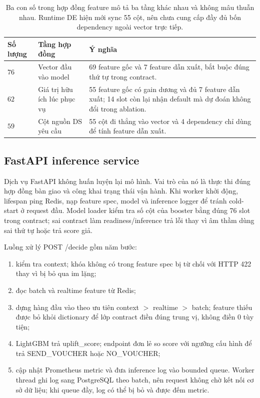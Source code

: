 \documentclass[11pt,a4paper]{article}
\DeclareRobustCommand{\code}[1]{{\small\texttt{#1}}}
\def\code#1{#1}%
\begin{document}
\begin{table}[H]
\centering
\small
\begin{tabularx}{\textwidth}{>{\centering\arraybackslash}p{1.8cm}
    >{\raggedright\arraybackslash}p{4.0cm}X}
\toprule
\textbf{Số lượng} & \textbf{Tầng hợp đồng} & \textbf{Ý nghĩa} \\
\midrule
$76$ & Vector đầu vào model & 69 feature gốc và 7 feature dẫn xuất, bắt buộc đúng thứ tự trong contract. \\
$62$ & Giá trị hữu ích lúc phục vụ & 55 feature gốc có gain dương và đủ 7 feature dẫn xuất; 14 slot còn lại nhận default mà dự đoán không đổi trong ablation. \\
$59$ & Cột nguồn DS yêu cầu & 55 cột đi thẳng vào vector và 4 dependency chỉ dùng để tính feature dẫn xuất. \\
\bottomrule
\end{tabularx}
\caption{Ba con số trong hợp đồng feature mô tả ba tầng khác nhau và không
mâu thuẫn nhau. Runtime DE hiện mới sync 55 cột, nên chưa cung cấp đầy đủ bốn
dependency ngoài vector trực tiếp.}
\label{tab:feature-contract-layers}
\end{table}

\subsection{FastAPI inference service}

Dịch vụ FastAPI không huấn luyện lại mô hình. Vai trò của nó là thực thi
đúng hợp đồng bàn giao và công khai trạng thái vận hành. Khi worker khởi động,
\code{lifespan} ping Redis, nạp feature spec, model và inference logger để
tránh cold-start ở request đầu. Model loader kiểm tra số cột của booster bằng
đúng 76 slot trong contract; sai contract làm readiness/inference trả lỗi
thay vì âm thầm dùng sai thứ tự hoặc trả score giả.

Luồng xử lý \code{POST /decide} gồm năm bước:
\begin{enumerate}
    \item kiểm tra context; khóa không có trong feature spec bị từ chối với
    HTTP 422 thay vì bị bỏ qua im lặng;
    \item đọc batch và realtime feature từ Redis;
    \item dựng hàng đầu vào theo ưu tiên context $>$ realtime $>$ batch;
    feature thiếu được bỏ khỏi dictionary để lớp contract điền đúng trung vị,
    không điền 0 tùy tiện;
    \item LightGBM trả \code{uplift\_score}; endpoint đơn lẻ so score với
    ngưỡng cấu hình để trả \code{SEND\_VOUCHER} hoặc \code{NO\_VOUCHER};
    \item cập nhật Prometheus metric và đưa inference log vào bounded queue.
    Worker thread ghi log sang PostgreSQL theo batch, nên request không chờ
    kết nối cơ sở dữ liệu; khi queue đầy, log có thể bị bỏ và được đếm metric.
\end{enumerate}
\end{document}
